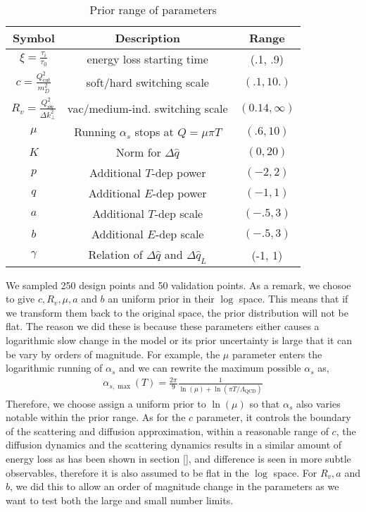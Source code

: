 \begin{table}
\centering
\caption{Prior range of parameters}\label{table:new:prior}
\begin{tabular}{ccc}
Symbol & Description & Range \\
\hline
$\xi = \frac{\tau_i}{\tau_0}$ & energy loss starting time & (.1, .9) \\
$c = \frac{Q_{\textrm{cut}}^2}{m_D^2}$ & soft/hard switching scale & $(.1, 10.)$ \\
$R_v = \frac{Q_{\textrm{sw}}^2}{\Delta k_\perp^2}$ & vac/medium-ind. switching scale & $(0.14, \infty)$\\
$\mu$ & Running $\alpha_s$ stops at $Q = \mu\pi T$ & $(.6, 10)$ \\
$K$ & Norm for $\Delta \hat{q}$ & $(0, 20)$\\ 
$p$ & Additional $T$-dep power  & $(-2, 2)$\\ 
$q$ & Additional $E$-dep power  & $(-1, 1)$\\ 
$a$ & Additional $T$-dep scale  & $(-.5, 3)$\\ 
$b$ & Additional $E$-dep scale  & $(-.5, 3)$\\ 
$\gamma$ & Relation of $\Delta \hat{q}$ and $\Delta \hat{q}_L$  & (-1, 1)\\ 
\end{tabular}
\end{table}

We sampled 250 design points and 50 validation points. 
As a remark, we chosoe to give $c, R_v, \mu, a$ and $b$ an uniform prior in their $\log$ space.
This means that if we transform them back to the original space, the prior distribution will not be flat.
The reason we did these is because these parameters either causes a logarithmic slow change in the model or its prior uncertainty is large that it can be vary by orders of magnitude.
For example, the $\mu$ parameter enters the logarithmic running of $\alpha_s$ and we can rewrite the maximum possible $\alpha_s$ as,
\begin{eqnarray}
\alpha_{s,\max}(T) = \frac{2\pi}{9}\frac{1}{\ln(\mu) + \ln(\pi T/\Lambda_{\textrm{QCD}})}
\end{eqnarray}
Therefore, we choose assign a uniform prior to $\ln(\mu)$ so that $\alpha_s$ also varies notable within the prior range.
As for the $c$ parameter, it controls the boundary of the scattering and diffusion approximation, within a reasonable range of $c$, the diffusion dynamics and the scattering dynamics results in a similar amount of energy loss as has been shown in section [], and difference is seen in more subtle observables, therefore it is also assumed to be flat in the $\log$ space.
For $R_v, a$ and $b$, we did this to allow an order of magnitude change in the parameters as we want to test both the large and small number limits.

